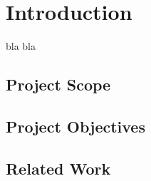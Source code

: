 
\chapter{Introduction}
\label{chapter:intro}

bla bla\cite{iso-odf}

\section{Project Scope}
\label{sec:intro:scope}

\section{Project Objectives}
\label{sec:intro:objectives}

\section{Related Work}
\label{sec:intro:related}
